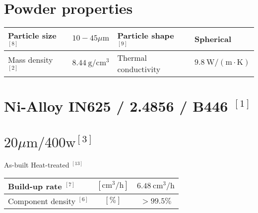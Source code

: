 \documentclass[10pt]{article}
\begin{document}
\section*{Powder properties}
\begin{center}
\begin{tabular}{|l|l|l|l|}
\hline
Particle size ${ }^{[8]}$ & $10-45 \mu \mathrm{m}$ & Particle shape ${ }^{[9]}$ & Spherical \\
\hline
Mass density ${ }^{[2]}$ & $8.44 \mathrm{~g} / \mathrm{cm}^{3}$ & Thermal conductivity & $9.8 \mathrm{~W} /(\mathrm{m} \cdot \mathrm{K})$ \\
\hline
\end{tabular}
\end{center}

\section*{Ni-Alloy IN625 / 2.4856 / B446 ${ }^{[1]}$}
\section*{$20 \mu \mathrm{m} / 400 \mathrm{w}^{[3]}$}
 As-built Heat-treated ${ }^{[13]}$\begin{center}
\begin{tabular}{|l|c|c|}
\hline
Build-up rate $^{[7]}$ & $\left[\mathrm{cm}^{3} / \mathrm{h}\right]$ & $6.48 \mathrm{~cm}^{3} / \mathrm{h}$ \\
\hline
Component density $^{[6]}$ & $[\%]$ & $>99.5 \%$ \\
\hline
\end{tabular}
\end{center}
\end{document}
